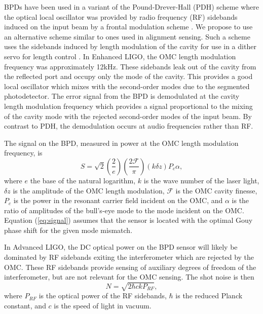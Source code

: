 BPDs have been used in a variant of the Pound-Drever-Hall (PDH) scheme where the optical local oscillator was provided by radio frequency (RF) sidebands induced on the input beam by a frontal modulation scheme \cite{Mueller:00}. %
We propose to use an alternative scheme similar to ones used in alignment sensing. %
Such a scheme uses the sidebands induced by length modulation of the cavity for use in a dither servo for length control \cite{kwee:07}. %
In Enhanced LIGO, the OMC length modulation frequency was approximately 12kHz. %
These sidebands leak out of the cavity from the reflected port and occupy only the  mode of the cavity. %
This provides a good local oscillator which mixes with the second-order modes due to the segmented photodetector. %
The error signal from the BPD is demodulated at the cavity length modulation frequency which provides a signal proportional to the mixing of the  cavity mode with the rejected second-order modes of the input beam. %
By contrast to PDH, the demodulation occurs at audio frequencies rather than RF.

The signal on the BPD, measured in power at the OMC length modulation frequency, is \cite{Sigg:00,ModalModelUpdate4}
\begin{equation}
\label{eq:signal}
S = \sqrt{2} \left(\frac{2}{e}\right)\left(\frac{2 \mathcal{F}}{\pi}\right)\left(k \delta z\right) P_c \alpha,
\end{equation}
where $e$ the base of the natural logarithm, $k$ is the wave number of the laser light, $\delta z$ is the amplitude of the OMC length modulation, $\mathcal{F}$ is the OMC cavity finesse, $P_c$ is the power in the resonant carrier field incident on the OMC, and $\alpha$ is the ratio of amplitudes of the bull's-eye mode to the  mode incident on the OMC. %
Equation (\ref{eq:signal}) assumes that the sensor is located with the optimal Gouy phase shift for the given mode mismatch.

In Advanced LIGO, the DC optical power on the BPD sensor will likely be dominated by RF sidebands exiting the interferometer which are rejected by the OMC. %
These RF sidebands provide sensing of auxiliary degrees of freedom of the interferometer, but are not relevant for the OMC sensing. %
The shot noise is then
\begin{equation}
N = \sqrt{2 \hbar c k P_{RF}},
\end{equation}
where $P_{RF}$ is the optical power of the RF sidebands, $\hbar$ is the reduced Planck constant, and $c$ is the speed of light in vacuum.

